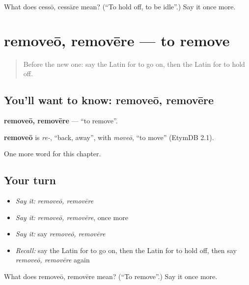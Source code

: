 \begin{tcolorbox}[breakable,colback=teal!4,colframe=teal!35!black,title={Before you move on}]
What does cessō, cessāre mean? (\textquotedblleft{}To hold off, to be idle\textquotedblright{}.) Say it once more.
\end{tcolorbox}
\section[removeō, removēre]{removeō, removēre — to remove}

\label{lesson:LA-C229-removeo}



\begin{quote}
Before the new one: say the Latin for to go on, then the Latin for to hold off.
\end{quote}

\subsection*{You'll want to know: removeō, removēre}
\textbf{removeō, removēre} — \textquotedblleft{}to remove\textquotedblright{}.

\begin{cousinweb}
\textbf{removeō} is \emph{re-}, \textquotedblleft{}back, away\textquotedblright{}, with \emph{moveō}, \textquotedblleft{}to move\textquotedblright{} (EtymDB 2.1).
\end{cousinweb}

\begin{grammarlens}[title={What you've built}]
One more word for this chapter.
\end{grammarlens}

\subsection*{Your turn}
\begin{itemize}
\raggedright
  \item \emph{Say it:} \emph{removeō, removēre}
  \item \emph{Say it:} \emph{removeō, removēre}, once more
  \item \emph{Say it:} say \emph{removeō, removēre}
  \item \emph{Recall:} say the Latin for to go on, then the Latin for to hold off, then say \emph{removeō, removēre} again
\end{itemize}

\begin{tcolorbox}[breakable,colback=teal!4,colframe=teal!35!black,title={Before you move on}]
What does removeō, removēre mean? (\textquotedblleft{}To remove\textquotedblright{}.) Say it once more.
\end{tcolorbox}

